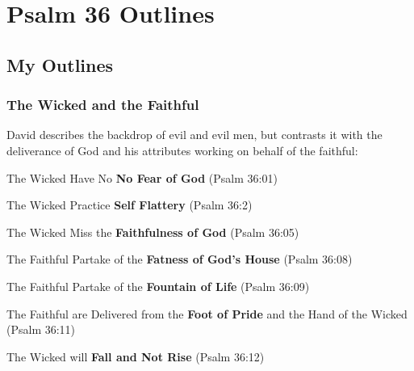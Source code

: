 \section{Psalm 36 Outlines}

\subsection{My Outlines}

\subsubsection{The Wicked and the Faithful}
David describes the backdrop of evil and evil men, but contrasts it with the deliverance of God and his attributes working on behalf of the faithful:
\begin{compactenum}[I.]
    \item The Wicked Have No \textbf{No Fear of God} (Psalm 36:01)
    \item The Wicked Practice \textbf{Self Flattery} (Psalm 36:2)
    \item The Wicked Miss the \textbf{Faithfulness of God}  (Psalm 36:05)
    \item The Faithful Partake of the \textbf{Fatness of God's House}  (Psalm 36:08)
    \item The Faithful Partake of the \textbf{Fountain of Life}  (Psalm 36:09)
    \item The Faithful are Delivered from the \textbf{Foot of Pride} and the Hand of the Wicked  (Psalm 36:11)
    \item The Wicked will \textbf{Fall and Not Rise}  (Psalm 36:12)\end{compactenum}


